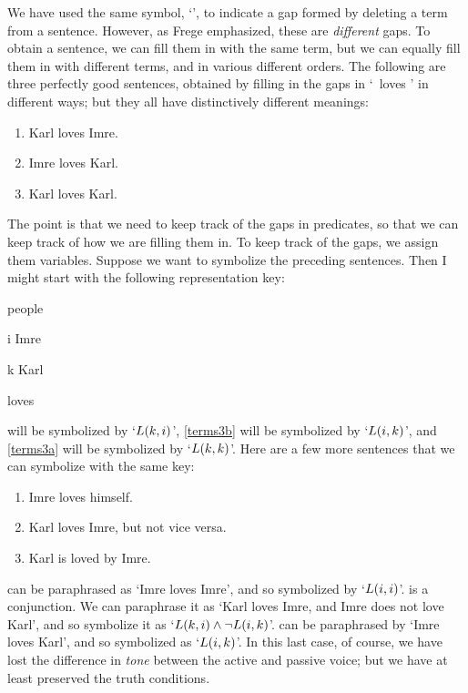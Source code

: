 We have used the same symbol, `\blank', to indicate a gap formed by deleting a term from a sentence. However, as \foreignlanguage{german}{Frege} emphasized, these are \emph{different} gaps. To obtain a sentence, we can fill them in with the same term, but we can equally fill them in with different terms, and in various different orders. The following are three perfectly good sentences, obtained by filling in the gaps in `\blank\ loves \blank{}' in different ways; but they all have distinctively different meanings:
\begin{enumerate}
	\item\label{terms3} Karl loves Imre.
	\item\label{terms3b} Imre loves Karl.
	\item\label{terms3a} Karl loves Karl.
\end{enumerate}
The point is that we need to keep track of the gaps in predicates, so that we can keep track of how we are filling them in. To keep track of the gaps, we assign them variables. Suppose we want to symbolize the preceding sentences. Then I might start with the following representation key: 
	\begin{ekey}
		\item[\text{domain}] people
		\item[i] Imre
		\item[k] Karl
		\item[\atom{L}{x,y}]  loves 
	\end{ekey}
  will be symbolized by `$L(k,i)$', \cref*{terms3b} will be symbolized by `$L(i,k)$', and \cref*{terms3a} will be symbolized by `$L(k,k)$'. Here are a few more sentences that we can symbolize with the same key:
\begin{enumerate}
	\item\label{terms4} Imre loves himself.
	\item\label{terms5} Karl loves Imre, but not vice versa.
	\item\label{terms6} Karl is loved by Imre.
\end{enumerate}
 can be paraphrased as `Imre loves Imre', and so symbolized by `$L(i,i)$'.  is a conjunction. We can paraphrase it as `Karl loves Imre, and Imre does not love Karl', and so symbolize it as `$L(k,i) \wedge \neg L(i,k)$'.  can be paraphrased by `Imre loves Karl', and so symbolized as `$L(i,k)$'. In this last case, of course, we have lost the difference in \emph{tone} between the active and passive voice; but we have at least preserved the truth conditions.

